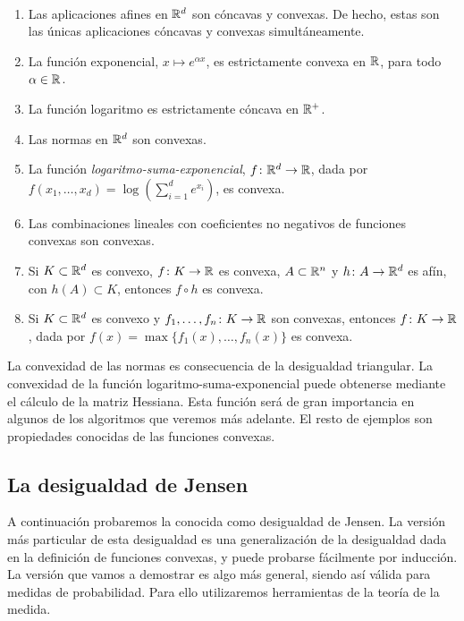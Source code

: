 \begin{example}~
    \begin{enumerate}
        \item Las aplicaciones afines en $\mathbb{R}^d$ son cóncavas y convexas. De hecho, estas son las únicas aplicaciones cóncavas y convexas simultáneamente.
        \item La función exponencial, $x \mapsto e^{\alpha x}$, es estrictamente convexa en $\mathbb{R}$, para todo $\alpha \in \mathbb{R}$.
        \item La función logaritmo es estrictamente cóncava en $\mathbb{R}^+$.
        \item Las normas en $\mathbb{R}^d$ son convexas.
        \item La función \emph{logaritmo-suma-exponencial}, $f\colon \mathbb{R}^d \to \mathbb{R}$, dada por $f(x_1,\dots,x_d) = \log(\sum_{i=1}^d e^{x_i})$, es convexa.
        \item Las combinaciones lineales con coeficientes no negativos de funciones convexas son convexas.
        \item Si $K \subset \mathbb{R}^d$ es convexo, $f \colon K \to \mathbb{R}$ es convexa, $A \subset \mathbb{R}^n$ y $h\colon A \to \mathbb{R}^d$ es afín, con $h(A) \subset K$, entonces $f \circ h$ es convexa.
        \item Si $K \subset \mathbb{R}^d$ es convexo y $f_1,\dots,f_n \colon K \to \mathbb{R}$ son convexas, entonces $f \colon K \to \mathbb{R}$, dada por $f(x) = \max\{f_1(x),\dots,f_n(x)\}$ es convexa.
    \end{enumerate}
    La convexidad de las normas es consecuencia de la desigualdad triangular. La convexidad de la función logaritmo-suma-exponencial puede obtenerse mediante el cálculo de la matriz Hessiana. Esta función será de gran importancia en algunos de los algoritmos que veremos más adelante. El resto de ejemplos son propiedades conocidas de las funciones convexas.
\end{example}

\subsection{La desigualdad de Jensen}

A continuación probaremos la conocida como desigualdad de Jensen. La versión más particular de esta desigualdad es una generalización de la desigualdad dada en la definición de funciones convexas, y puede probarse fácilmente por inducción. La versión que vamos a demostrar es algo más general, siendo así válida para medidas de probabilidad. Para ello utilizaremos herramientas de la teoría de la medida.

